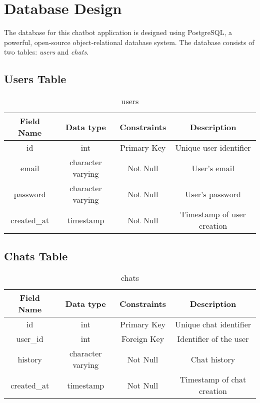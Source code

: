 \section{Database Design}
The database for this chatbot application is designed using PostgreSQL, a powerful, open-source object-relational database system. The database consists of two tables: \textit{users} and \textit{chats}.

\subsection{Users Table}


\begin{table}[h!]
  \centering
  \begin{tabular}{|c|c|c|c|}
    \hline
    Field Name & Data type & Constraints & Description\\ \hline
    id & int & Primary Key & Unique user identifier\\ \hline
    email & character varying & Not Null & User's email\\ \hline
    password & character varying & Not Null & User's password\\ \hline
    created\_at & timestamp & Not Null & Timestamp of user creation\\ \hline
  \end{tabular}
  \vspace*{7pt}

  \caption{users}
\end{table}

\subsection{Chats Table}

\begin{table}[h!]
  \centering
  \begin{tabular}{|c|c|c|c|}
    \hline
    Field Name & Data type & Constraints & Description\\ \hline
    id & int & Primary Key & Unique chat identifier\\ \hline
    user\_id & int & Foreign Key & Identifier of the user \\ \hline
    history & character varying & Not Null & Chat history\\ \hline
    created\_at & timestamp & Not Null & Timestamp of chat creation\\ \hline
  \end{tabular}
  \vspace*{7pt}
  \caption{chats}

\end{table}

